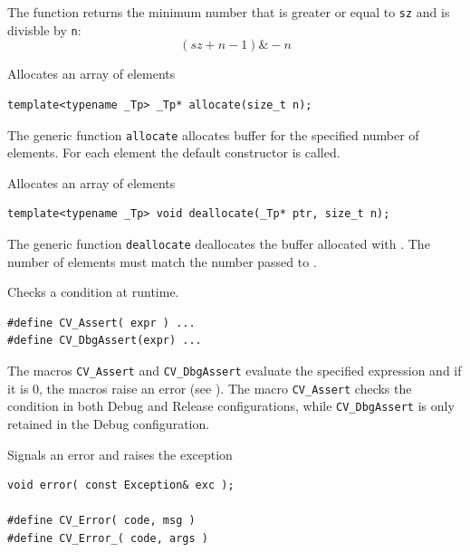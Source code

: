 The function returns the minimum number that is greater or equal to \texttt{sz} and is divisble by \texttt{n}:
\[(sz + n-1) \& -n\]


\label{allocate}
Allocates an array of elements

\begin{lstlisting}
template<typename _Tp> _Tp* allocate(size_t n);
\end{lstlisting}
\begin{description}
\end{description}

The generic function \texttt{allocate} allocates buffer for the specified number of elements. For each element the default constructor is called.


\label{allocate}
Allocates an array of elements

\begin{lstlisting}
template<typename _Tp> void deallocate(_Tp* ptr, size_t n);
\end{lstlisting}
\begin{description}
\end{description}

The generic function \texttt{deallocate} deallocates the buffer allocated with . The number of elements must match the number passed to .

\label{CV Assert}
Checks a condition at runtime.

\begin{lstlisting}
#define CV_Assert( expr ) ...
#define CV_DbgAssert(expr) ...
\end{lstlisting}

\begin{description}
\end{description}

The macros \texttt{CV\_Assert} and \texttt{CV\_DbgAssert} evaluate the specified expression and if it is 0, the macros raise an error (see ). The macro \texttt{CV\_Assert} checks the condition in both Debug and Release configurations, while \texttt{CV\_DbgAssert} is only retained in the Debug configuration.

\label{error}
Signals an error and raises the exception

\begin{lstlisting}
void error( const Exception& exc );

#define CV_Error( code, msg )
#define CV_Error_( code, args )
\end{lstlisting}
\begin{description}
\end{description}

